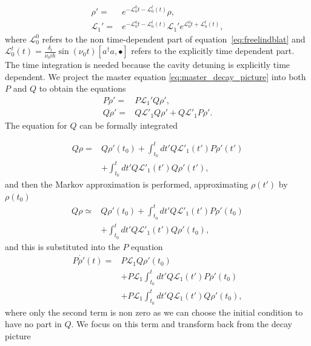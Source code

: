 \documentclass[reprint, amsmath,amssymb, aps,pra]{revtex4-1}
\begin{document}
\begin{align}
\rho' =& e^{-\mathcal{L}_0^0t - \mathcal{L}_0^t(t)}\rho,\\
\mathcal{L}_1' =&e^{-\mathcal{L}_0^0t - \mathcal{L}_0^t(t)}\mathcal{L}_1' e^{\mathcal{L}_0^0t +\mathcal{L}_0^t(t)},
\end{align}
where $\mathcal{L}_0^0$ refers to the non time-dependent part of
equation~\eqref{eq:freelindblat} and
$\mathcal{L}_0^t(t)=\frac{\delta_t}{\nu_0 i \hbar} \sin(\nu_0t)[a^\dagger
a,\bullet]$ refers to the explicitly time dependent part. The time
integration is needed because the cavity detuning is explicitly time
dependent. We project the master equation
\eqref{eq:master_decay_picture} into both $P$ and $Q$ to obtain the
equations
\begin{align*}
P\dot{\rho}' =& P\mathcal{L}_1'Q\rho', \\
Q\dot{\rho}' =& Q\mathcal{L}'_1Q\rho' + Q\mathcal{L}'_1P\rho'.
\end{align*} The equation for $Q$ can be formally integrated

\begin{align*}
Q\rho =& Q\rho'(t_0) + \int_{t_0}^{t}dt' Q\mathcal{L}'_1(t')P\rho'(t')\\
       &+\int_{t_0}^{t}dt'Q\mathcal{L}'_1(t')Q\rho'(t'),
\end{align*}
 and then the Markov approximation is performed, approximating $\rho(t')$ by $\rho(t_0)$
\begin{align*}
Q\rho\simeq & Q\rho'(t_0) + \int_{t_0}^{t}dt' Q\mathcal{L}'_1(t')P\rho'(t_0)\\
       &+\int_{t_0}^{t}dt'Q\mathcal{L}'_1(t')Q\rho'(t_0),
\end{align*}
and this is substituted into the $P$ equation
\begin{align}
P\dot{\rho'}(t) =& P\mathcal{L}_1Q\rho'(t_0)\\ 
 &+ P\mathcal{L}_1\int_{t_0}^{t}dt' Q\mathcal{L}_1(t')P\rho'(t_0)\nonumber \\
 &+ P\mathcal{L}_1\int_{t_0}^{t}dt'Q\mathcal{L}_1(t')Q\rho'(t_0)\nonumber,
\end{align}
where only the second term is non zero as we can choose the initial
condition to have no part in $Q$. We focus on this term and transform
back from the decay picture
\end{document}
